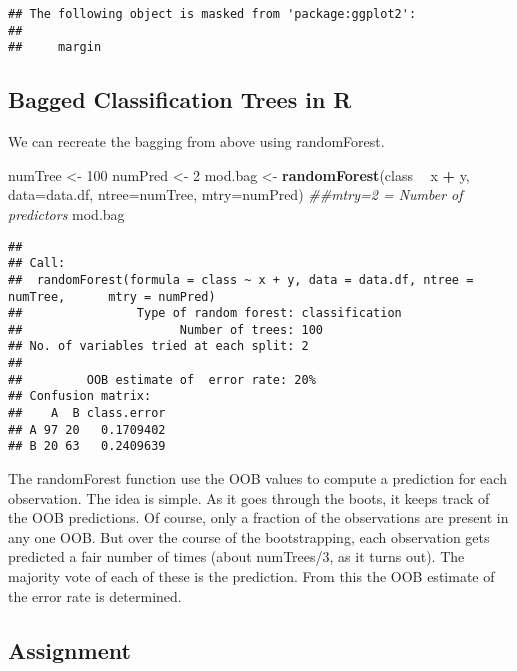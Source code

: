 \documentclass[]{article}
\newenvironment{Shaded}{\begin{snugshade}}{\end{snugshade}}
\newcommand{\CommentTok}[1]{\textcolor[rgb]{0.56,0.35,0.01}{\textit{#1}}}
\newcommand{\DataTypeTok}[1]{\textcolor[rgb]{0.13,0.29,0.53}{#1}}
\newcommand{\DecValTok}[1]{\textcolor[rgb]{0.00,0.00,0.81}{#1}}
\newcommand{\KeywordTok}[1]{\textcolor[rgb]{0.13,0.29,0.53}{\textbf{#1}}}
\newcommand{\NormalTok}[1]{#1}
\newcommand{\OperatorTok}[1]{\textcolor[rgb]{0.81,0.36,0.00}{\textbf{#1}}}
\newcommand{\StringTok}[1]{\textcolor[rgb]{0.31,0.60,0.02}{#1}}
\begin{document}
\begin{verbatim}
## The following object is masked from 'package:ggplot2':
## 
##     margin
\end{verbatim}

\hypertarget{bagged-classification-trees-in-r}{%
\subsection{Bagged Classification Trees in
R}\label{bagged-classification-trees-in-r}}

We can recreate the bagging from above using randomForest.

\begin{Shaded}
\begin{Highlighting}[]
\NormalTok{numTree <-}\StringTok{ }\DecValTok{100}
\NormalTok{numPred <-}\StringTok{ }\DecValTok{2}
\NormalTok{mod.bag <-}\StringTok{ }\KeywordTok{randomForest}\NormalTok{(class }\OperatorTok{~}\StringTok{ }\NormalTok{x }\OperatorTok{+}\StringTok{ }\NormalTok{y,}
                        \DataTypeTok{data=}\NormalTok{data.df,}
                        \DataTypeTok{ntree=}\NormalTok{numTree,}
                        \DataTypeTok{mtry=}\NormalTok{numPred) }\CommentTok{##mtry=2 = Number of predictors}
\NormalTok{mod.bag}
\end{Highlighting}
\end{Shaded}

\begin{verbatim}
## 
## Call:
##  randomForest(formula = class ~ x + y, data = data.df, ntree = numTree,      mtry = numPred) 
##                Type of random forest: classification
##                      Number of trees: 100
## No. of variables tried at each split: 2
## 
##         OOB estimate of  error rate: 20%
## Confusion matrix:
##    A  B class.error
## A 97 20   0.1709402
## B 20 63   0.2409639
\end{verbatim}

The randomForest function use the OOB values to compute a prediction for
each observation. The idea is simple. As it goes through the boots, it
keeps track of the OOB predictions. Of course, only a fraction of the
observations are present in any one OOB. But over the course of the
bootstrapping, each observation gets predicted a fair number of times
(about numTrees/3, as it turns out). The majority vote of each of these
is the prediction. From this the OOB estimate of the error rate is
determined.

\hypertarget{assignment}{%
\subsection{Assignment}\label{assignment}}
\end{document}

